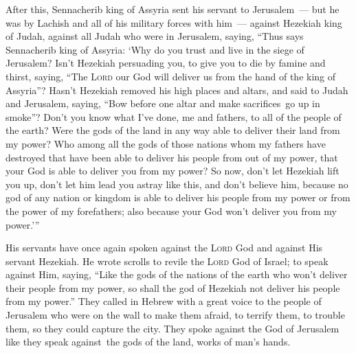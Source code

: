\begin{inparaenum}
     After this, Sennacherib king of Assyria sent his servant to Jerusalem~--- but he was by Lachish and all of his military forces with him~--- against Hezekiah king of Judah, against all Judah who were in Jerusalem, saying,%
     ``Thus says Sennacherib king of Assyria: `Why do you trust and live in the siege of Jerusalem?%
     Isn't Hezekiah persuading you, to give you to die by famine and thirst, saying, ``The \textsc{Lord} our God will deliver us from the hand of the king of Assyria''?%
     Hasn't Hezekiah removed his high places and altars, and said to Judah and Jerusalem, saying, ``Bow before one altar and make sacrifices\understood\ go up in smoke''?%
     Don't you know what I've done, me and fathers, to all of the people of the earth? Were the gods of the land in any way able to deliver their land from my power?%
     Who among all the gods of those nations whom my fathers have destroyed that have been able to deliver his people from out of my power, that your God is able to deliver you from my power?%
     So now, don't let Hezekiah lift you up, don't let him lead you astray like this, and don't believe him, because no god of any nation or kingdom is able to deliver his people from my power or from the power of my forefathers; also because your God won't deliver you from my power.'\thinspace''%
    
     His servants have once again spoken against the \textsc{Lord} God and against His servant Hezekiah.%
     He wrote scrolls to revile the \textsc{Lord} God of Israel; to speak against Him, saying, ``Like the gods of the nations of the earth who won't deliver their people from my power, so shall the god of Hezekiah not deliver his people from my power.''%
     They called in Hebrew with a great voice to the people of Jerusalem who were on the wall to make them afraid, to terrify them, to trouble them, so they could capture the city.%
     They spoke against the God of Jerusalem like they speak against\understood\ the gods of the land, works of man's hands.%
    

\end{inparaenum}
